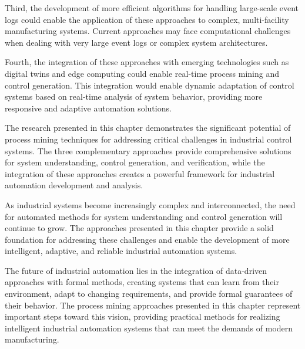 Third, the development of more efficient algorithms for handling large-scale event logs could enable the application of these approaches to complex, multi-facility manufacturing systems. Current approaches may face computational challenges when dealing with very large event logs or complex system architectures.

Fourth, the integration of these approaches with emerging technologies such as digital twins and edge computing could enable real-time process mining and control generation. This integration would enable dynamic adaptation of control systems based on real-time analysis of system behavior, providing more responsive and adaptive automation solutions.

The research presented in this chapter demonstrates the significant potential of process mining techniques for addressing critical challenges in industrial control systems. The three complementary approaches provide comprehensive solutions for system understanding, control generation, and verification, while the integration of these approaches creates a powerful framework for industrial automation development and analysis.

As industrial systems become increasingly complex and interconnected, the need for automated methods for system understanding and control generation will continue to grow. The approaches presented in this chapter provide a solid foundation for addressing these challenges and enable the development of more intelligent, adaptive, and reliable industrial automation systems.

The future of industrial automation lies in the integration of data-driven approaches with formal methods, creating systems that can learn from their environment, adapt to changing requirements, and provide formal guarantees of their behavior. The process mining approaches presented in this chapter represent important steps toward this vision, providing practical methods for realizing intelligent industrial automation systems that can meet the demands of modern manufacturing.
